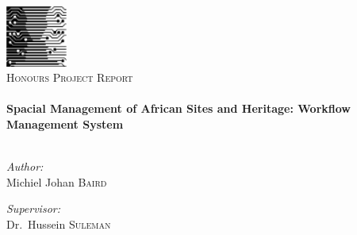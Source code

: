 \begin{titlepage}

\begin{center}


\includegraphics[width=0.15\textwidth]{./images/cslogo}\\[1cm]


\textsc{\Large Honours Project Report}\\[0.5cm]


\HRule \\[0.4cm]
{ \huge \bfseries Spacial Management of African Sites and Heritage: 
 Workflow Management System}\\[0.4cm]

\HRule \\[1.5cm]

\begin{minipage}{0.4\textwidth}
\begin{flushleft} \large
\emph{Author:}\\
Michiel Johan \textsc{Baird}
\end{flushleft}
\end{minipage}
\begin{minipage}{0.4\textwidth}
\begin{flushright} \large
\emph{Supervisor:} \\
Dr.~Hussein \textsc{Suleman}
\end{flushright}
\end{minipage}


\end{center}
\end{titlepage}
